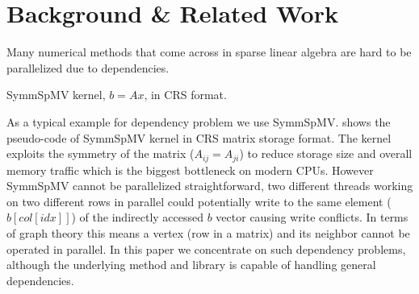 	\begin{comment}
	In this paper we present a novel approach called \acrshort{RACE} that helps in
	solving the general distance-k dependency problem for sparse kernels in a
	hardware efficient manner. The \acrshort{RACE} method is motivated by the
	shortcomings of multicoloring methods that are frequently used in this scenario.
	The method uses a recursive level-based approach to find optimal permutations
	while preserving good data locality. A thorough performance analysis shows that
	our method achieves high hardware efficiency on modern multi-core architectures
	and it outperforms traditional \acrfull{MC} and \acrshort{MKL} implementations
	by a factor of 2--2.5$\times$. We are on par with \acrfull{ABMC} method for
	small matrices, while for large matrices we gain almost a factor of
	1.5--2$\times$. Owing to the success of parallel implementations of
	sparse kernels having dependencies we further demonstrate first results
	of parallel iterative FEAST eigen solver using CGMN internal solver.
	\end{comment}


\section{Background \& Related Work} \label{sec:background}
Many numerical methods that come across in sparse linear algebra are hard to 
be parallelized due to dependencies. 

\begin{algorithm}[tb]
	\caption{\label{alg:symmSpMV} \acrshort{SymmSpMV} kernel,  $b=Ax$, in \acrshort{CRS} format.}
	\begin{algorithmic}[1]
			\EndFor
		\EndFor
	\end{algorithmic}
\end{algorithm}

 
As a typical example for \DTWO dependency problem we use \acrfull{SymmSpMV}. 
 shows the pseudo-code of \acrshort{SymmSpMV} kernel 
in \acrfull{CRS} \cite{CRS} matrix storage format. The kernel exploits the symmetry
of the matrix ($A_{ij} = A_{ji}$) to reduce storage size and overall 
memory traffic which is the biggest bottleneck on modern CPUs. 
However \acrshort{SymmSpMV} cannot be parallelized straightforward, two 
different threads working on two different rows in parallel could potentially 
write to the same element ($b[col[idx]]$) of the indirectly accessed $b$ vector
causing write conflicts.
In terms of graph theory this means a vertex (row in a matrix) and 
its \DTWO neighbor \cite{dist_k_def} cannot be operated in parallel.
In this paper we concentrate on such \DTWO dependency problems, although 
the underlying method and library is capable of handling 
general \DK dependencies.


